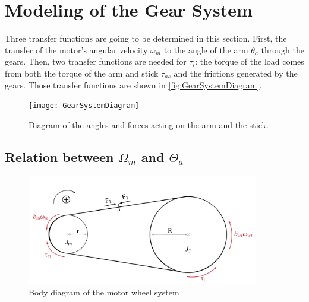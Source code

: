 
\graphicspath{{figures/modeling/gearTrain/}}
\section{Modeling of the Gear System}\label{sec:ModGearSys}
Three transfer functions are going to be determined in this section. First, the transfer of the motor's angular velocity $\omega_m$ to the angle of the arm $\theta_a$ through the gears. Then, two transfer functions are needed for $\tau_l$: the torque of the load comes from both the torque of the arm and stick $\tau_{as}$ and the frictions generated by the gears. Those transfer functions are shown in \autoref{fig:GearSystemDiagram}.
\begin{figure}[htbp]
	\centering
	\texttt{[image: GearSystemDiagram]}
	\caption{Diagram of the angles and forces acting on the arm and the stick.}
	\label{fig:GearSystemDiagram}
\end{figure}

\subsection{Relation between $\Omega_m$ and $\Theta_a$}

\begin{figure}[htbp]
	\centering
	\includegraphics[width=0.9\textwidth]{figures/modeling/gearTrain/GearAndBeltSystem.pdf}
	\caption{Body diagram of the motor wheel system}
	\label{fig:Belt&Pulley}
\end{figure}

\startexplain
{}
\stopexplain


